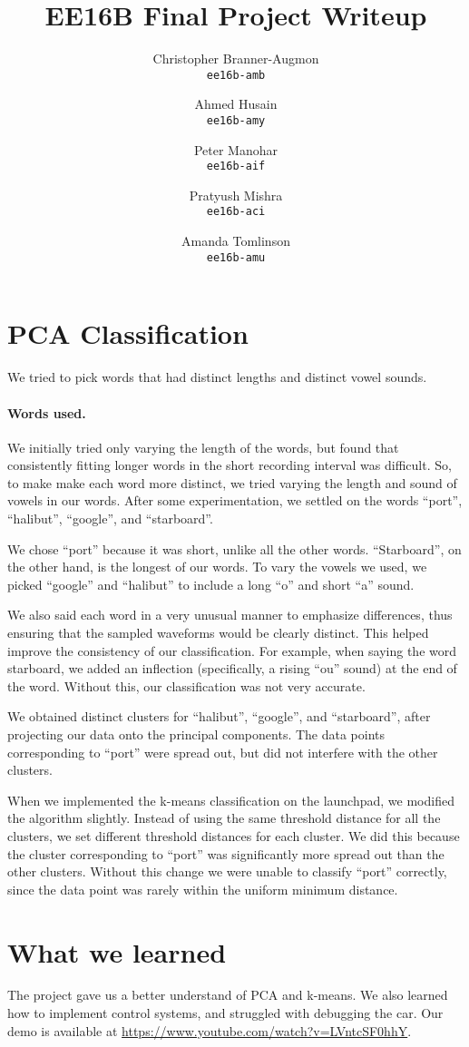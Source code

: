 \documentclass{article}
\title{\textsc{EE16B} Final Project Writeup}
\author{%
        Christopher Branner-Augmon \\
          \texttt{ee16b-amb}
        \and
        Ahmed Husain \\
          \texttt{ee16b-amy}
        \and
        Peter Manohar \\
          \texttt{ee16b-aif}
        \and
        Pratyush Mishra \\
        \texttt{ee16b-aci}
        \and
        Amanda Tomlinson\\
        \texttt{ee16b-amu}
      }
\begin{document}
\maketitle
\section*{PCA Classification}

We tried to pick words that had distinct lengths and distinct vowel sounds.

\paragraph{Words used.}
We initially tried only varying the length of the words, but found that
consistently fitting longer words in the short recording interval was difficult.
So, to make make each word more distinct, we tried varying the length and sound
of vowels in our words. After some experimentation, we settled on the words
``port'', ``halibut'', ``google'', and ``starboard''.

We chose ``port'' because it was short, unlike all the other words.
``Starboard'', on the other hand, is the longest of our words. To vary the
vowels we used, we picked ``google'' and ``halibut'' to include a long ``o''
and short ``a'' sound.

We also said each word in a very unusual manner to emphasize differences, thus
ensuring that the sampled waveforms would be clearly distinct.  This helped
improve the consistency of our classification. For example, when saying the
word starboard, we added an inflection (specifically, a rising ``ou'' sound) at
the end of the word. Without this, our classification was not very accurate.

We obtained distinct clusters for ``halibut'', ``google'', and ``starboard'',
after projecting our data onto the principal components.  The data points
corresponding to ``port'' were spread out, but did not interfere with the other
clusters.

When we implemented the k-means classification on the launchpad, we modified
the algorithm slightly. Instead of using the same threshold distance for all
the clusters, we set different threshold distances for each cluster. We did
this because the cluster corresponding to ``port'' was significantly more spread out
than the other clusters. Without this change we were unable to classify
``port'' correctly, since the data point was rarely within the uniform minimum
distance.

\section*{What we learned}

The project gave us a better understand of PCA and k-means. We also learned how
to implement control systems, and struggled with debugging the car. Our demo is
available at \url{https://www.youtube.com/watch?v=LVntcSF0hhY}.
\end{document}
